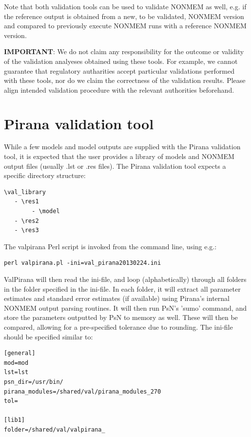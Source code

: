 {{{{\noindent Note that both validation tools can be used to validate NONMEM as
well, e.g. if the reference output is obtained from a new, to be
validated, NONMEM version and compared to previously execute NONMEM
runs with a reference NONMEM version.

\vspace{20pt}
\noindent \textbf{IMPORTANT}: We do not claim any responsibility for the outcome
or validity of the validation analyeses obtained using these
tools. For example, we cannot guarantee that regulatory autharities accept
particular validations performed with these tools, nor do we claim the correctness of the validation results.
Please align intended validation procedure with the relevant authorities beforehand.

\section{Pirana validation tool}
While a few models and model outputs are supplied with the Pirana
validation tool, it is expected that the user provides a library of
models and NONMEM output files (usually .lst or .res files). The
Pirana validation tool expects a specific directory structure:

\begin{lstlisting}
\val_library
   - \res1
        - \model
   - \res2
   - \res3
\end{lstlisting}

\noindent The valpirana Perl script is invoked from the command line, using
e.g.:

\begin{lstlisting}
perl valpirana.pl -ini=val_pirana20130224.ini 
\end{lstlisting}

ValPirana will then read the ini-file, and loop (alphabetically)
through all folders in the folder specified in the ini-file. In each
folder, it will extract all parameter estimates and standard error
estimates (if available) using Pirana's internal NONMEM output parsing
routines. It will then run PsN's 'sumo' command, and store the
parameters outputted by PsN to memory as well. These will then be
compared, allowing for a pre-specified tolerance due to rounding.
The ini-file should be specified similar to:

\begin{lstlisting}
[general]
mod=mod
lst=lst
psn_dir=/usr/bin/
pirana_modules=/shared/val/pirana_modules_270
tol=

[lib1]
folder=/shared/val/valpirana_


\end{lstlisting}}}}}
